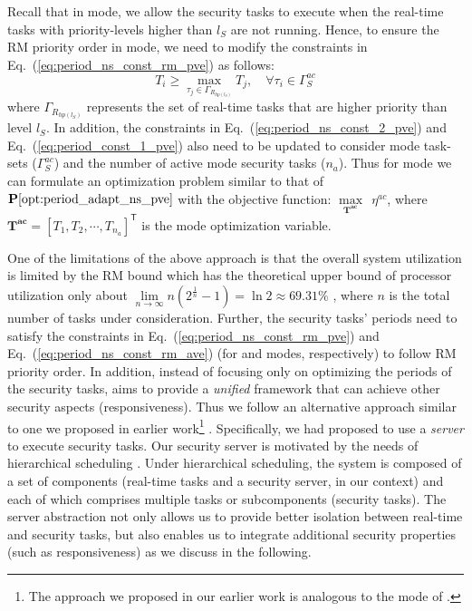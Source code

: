 \documentclass[../rt_server_main.tex]{subfiles}
\begin{document}
Recall that in \ave mode,  we allow the security tasks to execute when the real-time tasks with priority-levels higher than $l_S$ are not running. Hence, to ensure the RM priority order in \ave mode, we need to modify the constraints in Eq.~(\ref{eq:period_ns_const_rm_pve}) as follows:
\begin{equation}
T_i \geq \underset{\tau_j \in \Gamma_{R_{hp(l_S)}} }{\operatorname{max}} T_j, \quad \forall \tau_i \in \Gamma_S^{ac} \label{eq:period_ns_const_rm_ave}
\end{equation}
where $ \Gamma_{R_{hp(l_S)}}$ represents the set of real-time tasks that are higher priority than level $l_S$. In addition, %
the constraints in Eq.~(\ref{eq:period_ns_const_2_pve}) and 
Eq.~(\ref{eq:period_const_1_pve}) also need to be updated to consider \ave mode task-sets (\eg $\Gamma_S^{ac}$) and the number of active mode security tasks ($n_a$). Thus for \ave mode we can formulate an optimization problem similar to that of $\mathbf{P}\mathbf{\ref{opt:period_adapt_ns_pve}}$ with the objective function: $\underset{\mathbf{T}^{\boldsymbol{ac}}}{\operatorname{max}} ~~  \eta^{ac}$, where $\mathbf{T}^{\boldsymbol{ac}} = [ T_1, T_2, \cdots, T_{n_a} ]^{\mathsf{T}}$ is the \ave mode optimization variable.

One of the limitations of the above approach is that the overall system utilization is limited by the RM bound which has the theoretical upper bound of processor utilization only about $\lim\limits_{n \rightarrow \infty} n(2^{\frac{1}{n}}-1) = \ln 2 \approx 69.31\%$ \cite{Liu_n_Layland1973}, where $n$ is the total number of tasks under consideration. Further, the security tasks' periods need to satisfy the constraints in Eq.~(\ref{eq:period_ns_const_rm_pve}) and Eq.~(\ref{eq:period_ns_const_rm_ave}) (for \pve and \ave modes, respectively) to follow RM priority order. In addition, instead of focusing only on optimizing the periods of the security tasks, \coolname aims to provide a \textit{unified} framework that can achieve other security aspects (\viz responsiveness). Thus we follow an alternative approach similar to one we proposed in earlier work\footnote{The approach we proposed in our earlier work \cite{mhasan_rtss16} is analogous to the \pve mode of \coolname.} \cite{mhasan_rtss16}. Specifically, we had proposed 
to use a \textit{server} \cite{server_ab_uk} to execute security tasks. Our security server is motivated by the needs of hierarchical scheduling \cite{periodic_server_qp}. Under hierarchical
scheduling, the system is composed of a set of
components (\eg real-time tasks and a security server, in our context) and each of which comprises multiple tasks or subcomponents (\eg security tasks). The server abstraction not only allows us to provide better isolation between real-time and security tasks, but also enables us to integrate additional security properties (such as responsiveness) as we discuss in the following. 

%



 
\end{document}
